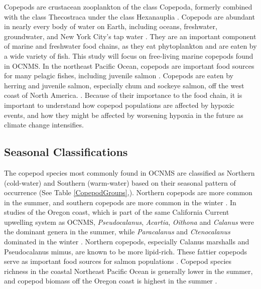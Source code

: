 \documentclass[12pt,twoside]{reedthesis}
\begin{document}
Copepods are crustacean zooplankton of the class Copepoda, formerly combined with the class Thecostraca under the class Hexanauplia \autocite{Oakley2013, Lozano-Fernandez2019}. Copepods are abundant in nearly every body of water on Earth, including oceans, freshwater, groundwater, and New York City's tap water \autocite{Vakati2023, Berger2004}. They are an important component of marine and freshwater food chains, as they eat phytoplankton and are eaten by a wide variety of fish. This study will focus on free-living marine copepods found in OCNMS. In the northeast Pacific Ocean, copepods are important food sources for many pelagic fishes, including juvenile salmon \autocite{Brodeur1990}. Copepods are eaten by herring and juvenile salmon, especially chum and sockeye salmon, off the west coast of North America. \autocite{Brodeur1990, Friedenberg2012}. Because of their importance to the food chain, it is important to understand how copepod populations are affected by hypoxic events, and how they might be affected by worsening hypoxia in the future as climate change intensifies. 

\subsection{Seasonal Classifications}

The copepod species most commonly found in OCNMS are classified as Northern (cold-water) and Southern (warm-water) based on their seasonal pattern of occurrence (See Table \ref{CopepodGroups},\autocite{NOAAFisheries2024, Peterson2003, Peterson1977}). Northern copepods are more common in the summer, and southern copepods are more common in the winter \autocite{NOAAFisheries2024}.  In studies of the Oregon coast, which is part of the same California Current upwelling system as OCNMS, \textit{Pseudocalanus}, \textit{Acartia}, \textit{Oithona} and \textit{Calanus} were the dominant genera in the summer, while \textit{Paracalanus} and \textit{Ctenocalanus} dominated in the winter \autocite{Peterson1977, Peterson2003}. Northern copepods, especially Calanus marshalls and Pseudocalanus mimus, are known to be more lipid-rich. These fattier copepods serve as important food sources for salmon populations \autocite{NOAAFisheries2024}. Copepod species richness in the coastal Northeast Pacific Ocean is generally lower in the summer, and copepod biomass off the Oregon coast is highest in the summer \autocite{Peterson2003}. 
\end{document}
